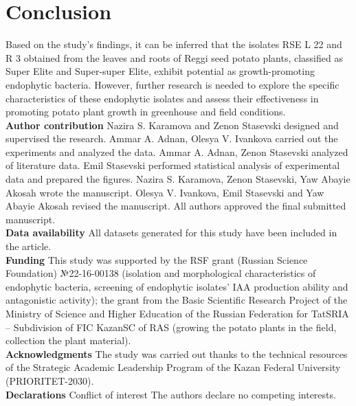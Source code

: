 \documentclass[sn-mathphys,Numbered]{sn-jnl}%
\theoremstyle{thmstyleone}%
\theoremstyle{thmstyletwo}%
\theoremstyle{thmstylethree}%
\begin{document}
\section*{Conclusion}

Based on the study's findings, it can be inferred that the isolates RSE L 22 and R 3 obtained from the leaves and roots of Reggi seed potato plants, classified as Super Elite and Super-super Elite, exhibit potential as growth-promoting endophytic bacteria. However, further research is needed to explore the specific characteristics of these endophytic isolates and assess their effectiveness in promoting potato plant growth in greenhouse and field conditions.\\


\textbf{Author contribution} Nazira S. Karamova and Zenon Stasevski designed and supervised the research. Ammar A. Adnan, Olesya V. Ivankova carried out the experiments and analyzed the data. Ammar A. Adnan, Zenon Stasevski analyzed of literature data. Emil Stasevski performed statistical analysis of experimental data and prepared the figures. Nazira S. Karamova, Zenon Stasevski, Yaw Abayie Akosah wrote the manuscript. Olesya V. Ivankova, Emil Stasevski and Yaw Abayie Akosah revised the manuscript. All authors approved the final submitted manuscript.\\

\textbf{Data availability} All datasets generated for this study have been included in the article.\\

\textbf{Funding} This study was supported by the RSF grant (Russian Science Foundation) №22-16-00138 (isolation and morphological characteristics of endophytic bacteria, screening of endophytic isolates' IAA production ability and antagonistic activity);  the grant from the Basic Scientific Research Project of the Ministry of Science and Higher Education of the Russian Federation for TatSRIA – Subdivision of FIC KazanSC of RAS (growing the potato plants in the field, collection the plant material).\\

\textbf{Acknowledgments} The study was carried out thanks to the technical resources of the Strategic Academic Leadership Program of the Kazan Federal University (PRIORITET-2030).\\

\textbf{Declarations } Conflict of interest The authors declare no competing interests.
\end{document}
